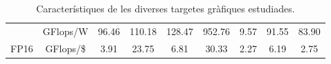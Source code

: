 \begin{table}[H]
\begin{adjustwidth}{-1.0in}{-1.0in}
\begin{center}
{\begin{tabular}{cc||c|c|c|c|c|c|c}
                                  & \cellcolor[HTML]{EFEFEF}GFlops/W                                                       & \cellcolor[HTML]{EFEFEF}96.46                                   & \cellcolor[HTML]{EFEFEF}110.18                                   & \cellcolor[HTML]{EFEFEF}128.47                                       & \cellcolor[HTML]{EFEFEF}952.76                                & \cellcolor[HTML]{EFEFEF}9.57                                         & \cellcolor[HTML]{EFEFEF}91.55                                          & \cellcolor[HTML]{EFEFEF}83.90                                          \\
\multirow{-3}{*}{FP16}            & GFlops/\$                                                                              & 3.91                                                            & 23.75                                                            & 6.81                                                                 & 30.33                                                         & 2.27                                                                 & 6.19                                                                   & 2.75 \\ \hline
\end{tabular}
    }
\end{center}
\end{adjustwidth}
    \caption{Característiques de les diverses targetes gràfiques estudiades.}
    \label{tab:gpu_specs}
\end{table}